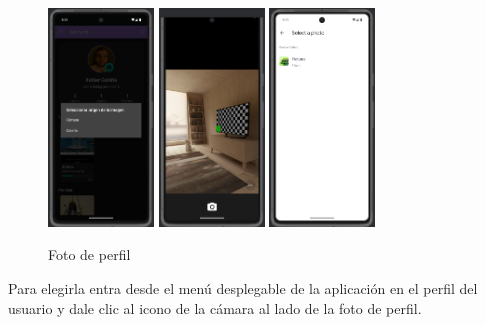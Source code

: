 \documentclass[a4paper,11pt]{report}
\begin{document}
      \begin{figure}[H]
        \centering
        \includegraphics[width=0.25\textwidth]{.img/foto_perfil_1.png}
        \hspace{1cm}
        \includegraphics[width=0.25\textwidth]{.img/foto_perfil_2.png}
        \hspace{1cm}
        \includegraphics[width=0.25\textwidth]{.img/foto_perfil_3.png}
        \caption{Foto de perfil}
        \label{fig:perfil}
      \end{figure}
      Para elegirla entra desde el menú desplegable de la aplicación en el perfil del usuario y dale clic al icono de la cámara al lado de la foto de perfil.
\end{document}
